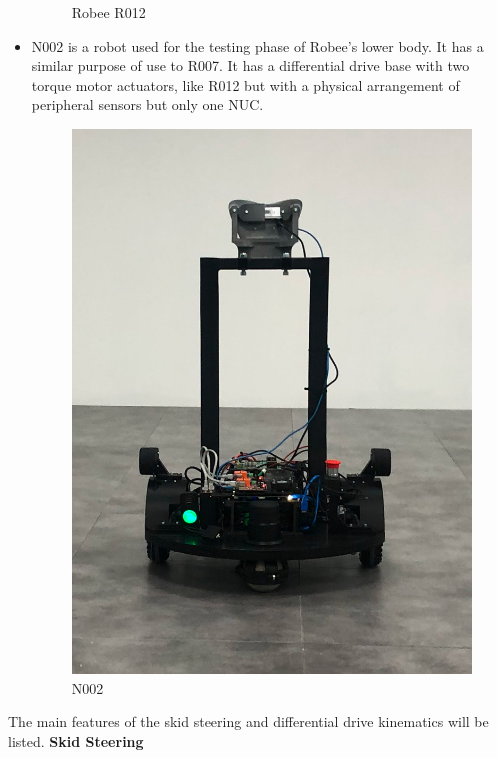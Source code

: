 \begin{itemize}
\begin{figure}[H]
        \caption{Robee R012}
        \label{fig:r012}
    \end{figure}
    \item N002 is a robot used for the testing phase of Robee's lower body. It has a similar purpose of use to R007.
    It has a differential drive base with two torque motor actuators, like R012 but with a physical arrangement of peripheral sensors but only one NUC.
    \begin{figure}[H]
        \centering
        \includegraphics[scale=0.10]{Images/Chapter 3/n002.jpg}
        \caption{N002}
        \label{fig:N002}
    \end{figure}
\end{itemize}
The main features of the skid steering and differential drive kinematics will be listed.
\textbf{Skid Steering}

